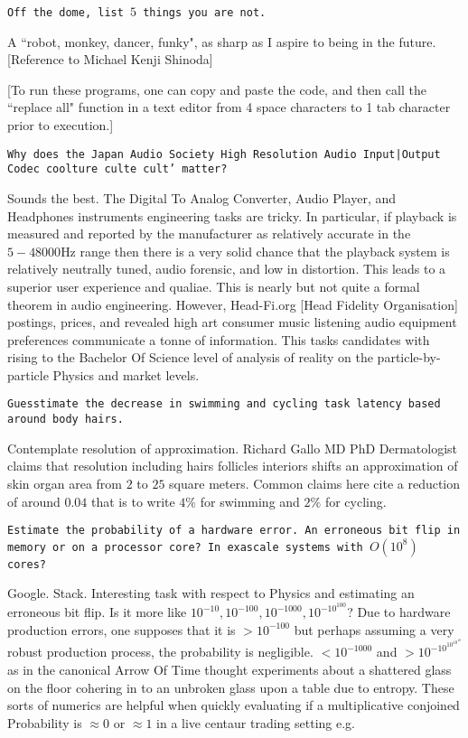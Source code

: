 \texttt{Off the dome, list $5$ things you are not.}

A ``robot, monkey, dancer, funky", as sharp as I aspire to being in the future. [Reference to Michael Kenji Shinoda]

[To run these programs, one can copy and paste the code, and then call the ``replace all" function in a text editor from 4 space characters to 1 tab character prior to execution.]

\texttt{Why does the Japan Audio Society High Resolution Audio Input|Output Codec coolture culte cult' matter?}

Sounds the best. The Digital To Analog Converter, Audio Player, and Headphones instruments engineering tasks are tricky. In particular, if playback is measured and reported by the manufacturer as relatively accurate in the $5-48000$Hz range then there is a very solid chance that the playback system is relatively neutrally tuned, audio forensic, and low in distortion. This leads to a superior user experience and qualiae. This is nearly but not quite a formal theorem in audio engineering. However, Head-Fi.org [Head Fidelity Organisation] postings, prices, and revealed high art consumer music listening audio equipment preferences communicate a tonne of information. This tasks candidates with rising to the Bachelor Of Science level of analysis of reality on the particle-by-particle Physics and market levels.

\texttt{Guesstimate the decrease in swimming and cycling task latency based around body hairs.}

Contemplate resolution of approximation. Richard Gallo MD PhD Dermatologist claims that resolution including hairs follicles interiors shifts an approximation of skin organ area from $2$ to $25$ square meters. Common claims here cite a reduction of around $0.04$ that is to write $4\%$ for swimming and $2\%$ for cycling.

\texttt{Estimate the probability of a hardware error. An erroneous bit flip in memory or on a processor core? In exascale systems with $O(10^8)$ cores?}

Google. Stack. Interesting task with respect to Physics and estimating an erroneous bit flip. Is it more like $10^{-10}, 10^{-100}, 10^{-1000}, 10^{-10^{100}}$? Due to hardware production errors, one supposes that it is $> 10^{-100}$ but perhaps assuming a very robust production process, the probability is negligible. $< 10^{-1000}$ and $> 10^{-10^{10^{10^{10}}}}$ as in the canonical Arrow Of Time thought experiments about a shattered glass on the floor cohering in to an unbroken glass upon a table due to entropy. These sorts of numerics are helpful when quickly evaluating if a multiplicative conjoined Probability is $\approx 0$ or $\approx 1$ in a live centaur trading setting e.g.

